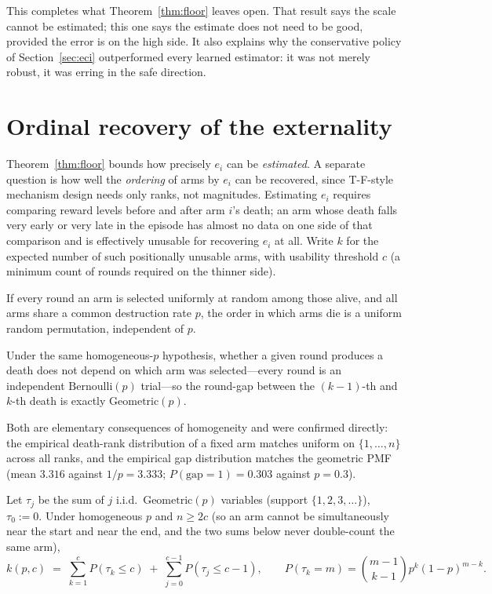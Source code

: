 This completes what Theorem~\ref{thm:floor} leaves open. That result says the scale
cannot be estimated; this one says the estimate does not need to be good, provided
the error is on the high side. It also explains why the conservative policy of
Section~\ref{sec:eci} outperformed every learned estimator: it was not merely
robust, it was erring in the safe direction.

\section{Ordinal recovery of the externality}
\label{sec:ordinal}

Theorem~\ref{thm:floor} bounds how precisely $e_i$ can be \emph{estimated}. A
separate question is how well the \emph{ordering} of arms by $e_i$ can be
recovered, since T-F-style mechanism design needs only ranks, not magnitudes.
Estimating $e_i$ requires comparing reward levels before and after arm $i$'s
death; an arm whose death falls very early or very late in the episode has
almost no data on one side of that comparison and is effectively unusable for
recovering $e_i$ at all. Write $k$ for the expected number of such positionally
unusable arms, with usability threshold $c$ (a minimum count of rounds required
on the thinner side).

\begin{lemma}[Exchangeability]
\label{lem:exch}
If every round an arm is selected uniformly at random among those alive, and all
arms share a common destruction rate $p$, the order in which arms die is a
uniform random permutation, independent of $p$.
\end{lemma}

\begin{lemma}[Memorylessness]
\label{lem:memless}
Under the same homogeneous-$p$ hypothesis, whether a given round produces a
death does not depend on which arm was selected---every round is an independent
$\mathrm{Bernoulli}(p)$ trial---so the round-gap between the $(k{-}1)$-th and
$k$-th death is exactly $\mathrm{Geometric}(p)$.
\end{lemma}

Both are elementary consequences of homogeneity and were confirmed directly:
the empirical death-rank distribution of a fixed arm matches uniform on
$\{1,\dots,n\}$ across all ranks, and the empirical gap distribution matches the
geometric PMF (mean $3.316$ against $1/p=3.333$; $P(\text{gap}{=}1)=0.303$
against $p=0.3$).

\begin{theorem}
\label{thm:exactk}
Let $\tau_j$ be the sum of $j$ i.i.d.\ $\mathrm{Geometric}(p)$ variables
(support $\{1,2,3,\dots\}$), $\tau_0 := 0$. Under homogeneous $p$ and $n\ge2c$
(so an arm cannot be simultaneously near the start and near the end, and the
two sums below never double-count the same arm),
\[
k(p,c) \;=\; \sum_{k=1}^{c} P(\tau_k \le c) \;+\; \sum_{j=0}^{c-1} P(\tau_j \le c-1),
\qquad
P(\tau_k{=}m) = \binom{m-1}{k-1} p^k (1-p)^{m-k}.
\]
\end{theorem}

